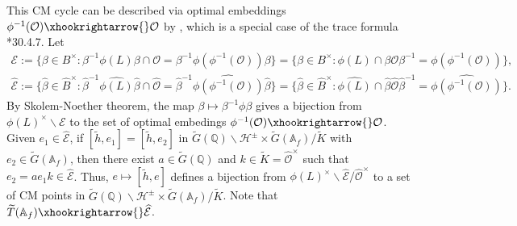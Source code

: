 \documentclass{amsart}
\numberwithin{equation}{subsection}
\numberwithin{theorem}{section}
\theoremstyle{definition}
\theoremstyle{remark}
\newcommand{\bA}{\mathbb{A}}
\newcommand{\bQ}{\mathbb{Q}}
\newcommand{\cE}{\mathcal{E}}
\newcommand{\cO}{\mathcal{O}}
\begin{document}
This CM cycle can be described via optimal embeddings $\phi^{-1}(\cO) \xhookrightarrow{}\cO$ by , which is a special case of the trace formula \cite{MR4279905}*{30.4.7}. Let \begin{align*}
    \mathcal{E} := \{\beta\in B^\times: \beta^{-1} \phi(L)\beta \cap \mathcal{O} = \beta^{-1}\phi(\phi^{-1}(\mathcal{O}))\beta\} = \{\beta\in B^\times: \phi(L)\cap \beta\mathcal{O}\beta^{-1} = \phi(\phi^{-1}(\mathcal{O}))\},\\
    \widehat{\mathcal{E}} := \{\widehat{\beta}\in \widehat{B}^\times: \widehat{\beta}^{-1} \widehat{\phi(L)}\widehat{\beta} \cap \widehat{\mathcal{O}} = \widehat{\beta}^{-1} \widehat{\phi(\phi^{-1}(\mathcal{O}))}\widehat{\beta}\}= \{\widehat{\beta}\in \widehat{B}^\times:  \widehat{\phi(L)} \cap \widehat{\beta}\widehat{\mathcal{O}}\widehat{\beta}^{-1} =  \widehat{\phi(\phi^{-1}(\mathcal{O}))}\}.
\end{align*} By Skolem-Noether theorem, the map $\beta \mapsto \beta^{-1}\phi\beta$ gives a bijection from $\phi(L)^\times \backslash \cE$ to the set of optimal embedings $\phi^{-1}(\cO)\xhookrightarrow{}\cO$. 
Given $e_1 \in \widehat{\cE}$, if $[\tilde{h}, e_1] =  [\tilde{h}, e_2]$ in $\widetilde{G}(\bQ)\backslash \mathcal{H}^{\pm} \times \widetilde{G}(\bA_f) / \widetilde{K}$ with $e_2\in \widetilde{G}(\bA_f)$, then there exist $a\in \widetilde{G}(\bQ)$ and $ k\in \widetilde{K}=\widehat{\cO}^\times$ such that $e_2 = a e_1 k \in \widehat{\cE}$. 
Thus, $e \mapsto [\tilde{h},e]$ defines a bijection from $\phi(L)^\times \backslash \widehat{\mathcal{E}}/\widehat{\mathcal{O}}^\times$ to a set of CM points in $\widetilde{G}(\bQ)\backslash \mathcal{H}^{\pm} \times \widetilde{G}(\bA_f) / \widetilde{K}$. Note that $\widetilde{T}(\bA_f)\xhookrightarrow{} \widehat{\mathcal{E}}$.
\end{document}

